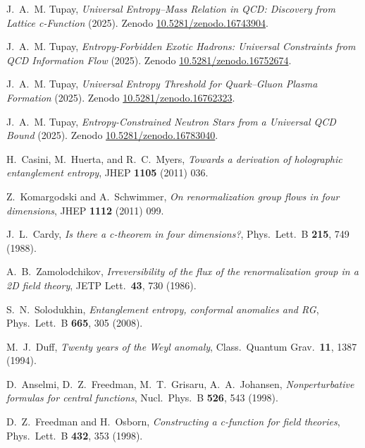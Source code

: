 \documentclass[11pt]{article}
\begin{document}
\begin{thebibliography}{99}\setlength{\itemsep}{0.25em}

J.~A.~M. Tupay, \emph{Universal Entropy--Mass Relation in QCD: Discovery from Lattice c-Function} (2025).
Zenodo \href{https://doi.org/10.5281/zenodo.16743904}{10.5281/zenodo.16743904}.

J.~A.~M. Tupay, \emph{Entropy-Forbidden Exotic Hadrons: Universal Constraints from QCD Information Flow} (2025).
Zenodo \href{https://doi.org/10.5281/zenodo.16752674}{10.5281/zenodo.16752674}.

J.~A.~M. Tupay, \emph{Universal Entropy Threshold for Quark--Gluon Plasma Formation} (2025).
Zenodo \href{https://doi.org/10.5281/zenodo.16762323}{10.5281/zenodo.16762323}.

J.~A.~M. Tupay, \emph{Entropy-Constrained Neutron Stars from a Universal QCD Bound} (2025).
Zenodo \href{https://doi.org/10.5281/zenodo.16783040}{10.5281/zenodo.16783040}.

H.~Casini, M.~Huerta, and R.~C.~Myers, \emph{Towards a derivation of holographic entanglement entropy}, JHEP \textbf{1105} (2011) 036.

Z.~Komargodski and A.~Schwimmer, \emph{On renormalization group flows in four dimensions}, JHEP \textbf{1112} (2011) 099.

J.~L.~Cardy, \emph{Is there a c-theorem in four dimensions?}, Phys.\ Lett.\ B \textbf{215}, 749 (1988).

A.~B.~Zamolodchikov, \emph{Irreversibility of the flux of the renormalization group in a 2D field theory}, JETP Lett.\ \textbf{43}, 730 (1986).

S.~N.~Solodukhin, \emph{Entanglement entropy, conformal anomalies and RG}, Phys.\ Lett.\ B \textbf{665}, 305 (2008).

M.~J.~Duff, \emph{Twenty years of the Weyl anomaly}, Class.\ Quantum Grav.\ \textbf{11}, 1387 (1994).

D.~Anselmi, D.~Z.~Freedman, M.~T.~Grisaru, A.~A.~Johansen, \emph{Nonperturbative formulas for central functions}, Nucl.\ Phys.\ B \textbf{526}, 543 (1998).

D.~Z.~Freedman and H.~Osborn, \emph{Constructing a c-function for field theories}, Phys.\ Lett.\ B \textbf{432}, 353 (1998).


\end{thebibliography}
\end{document}

